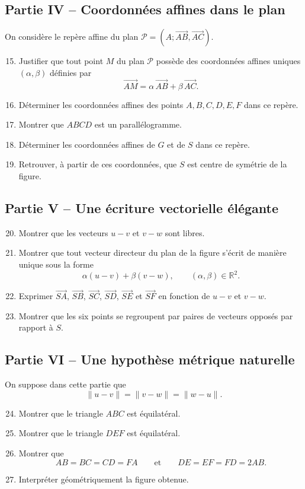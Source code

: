 \documentclass[11pt,a4paper]{article}
\newcommand{\R}{\mathbb{R}}
\begin{document}
\subsection*{Partie IV -- Coordonnées affines dans le plan}
On considère le repère affine du plan $\mathcal P=(A;\overrightarrow{AB},\overrightarrow{AC})$.
\begin{enumerate}[label=\arabic*.]
    \setcounter{enumi}{14}
    \item Justifier que tout point $M$ du plan $\mathcal P$ possède des coordonnées affines uniques $(\alpha,\beta)$ définies par
    \[
    \overrightarrow{AM}=\alpha\,\overrightarrow{AB}+\beta\,\overrightarrow{AC}.
    \]
    \item Déterminer les coordonnées affines des points $A,B,C,D,E,F$ dans ce repère.
    \item Montrer que $ABCD$ est un parallélogramme.
    \item Déterminer les coordonnées affines de $G$ et de $S$ dans ce repère.
    \item Retrouver, à partir de ces coordonnées, que $S$ est centre de symétrie de la figure.
\end{enumerate}

\subsection*{Partie V -- Une écriture vectorielle élégante}
\begin{enumerate}[label=\arabic*.]
    \setcounter{enumi}{19}
    \item Montrer que les vecteurs $u-v$ et $v-w$ sont libres.
    \item Montrer que tout vecteur directeur du plan de la figure s'écrit de manière unique sous la forme
    \[
    \alpha(u-v)+\beta(v-w),\qquad (\alpha,\beta)\in\R^2.
    \]
    \item Exprimer $\overrightarrow{SA}$, $\overrightarrow{SB}$, $\overrightarrow{SC}$, $\overrightarrow{SD}$, $\overrightarrow{SE}$ et $\overrightarrow{SF}$ en fonction de $u-v$ et $v-w$.
    \item Montrer que les six points se regroupent par paires de vecteurs opposés par rapport à $S$.
\end{enumerate}

\subsection*{Partie VI -- Une hypothèse métrique naturelle}
On suppose dans cette partie que
\[
\|u-v\|=\|v-w\|=\|w-u\|.
\]
\begin{enumerate}[label=\arabic*.]
    \setcounter{enumi}{23}
    \item Montrer que le triangle $ABC$ est équilatéral.
    \item Montrer que le triangle $DEF$ est équilatéral.
    \item Montrer que
    \[
    AB=BC=CD=FA\qquad\text{et}\qquad DE=EF=FD=2AB.
    \]
    \item Interpréter géométriquement la figure obtenue.
\end{enumerate}
\end{document}
